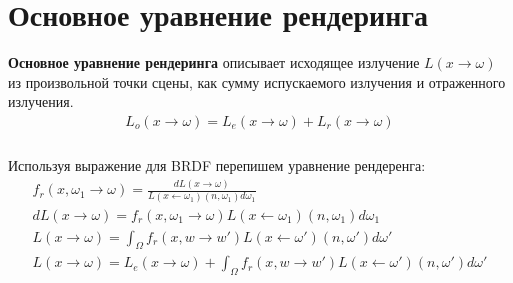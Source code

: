 \documentclass[titlepage]{article}
\begin{document}
\section{Основное уравнение рендеринга}
	\textbf{Основное уравнение рендеринга} описывает исходящее излучение $L(x\rightarrow\omega)$ из произвольной точки сцены, как сумму испускаемого излучения и отраженного излучения. 
\begin{gather}
	L_o(x\rightarrow\omega) = L_e(x\rightarrow\omega) + L_r(x\rightarrow\omega)
\end{gather} 
\subparagraph{} Используя выражение для BRDF перепишем уравнение рендеренга:
\begin{gather}
	f_r(x, \omega_1\rightarrow\omega) = \frac{dL(x\rightarrow\omega)}{L(x\leftarrow\omega_1)(n,\omega_1)d\omega_1} \\
	dL(x\rightarrow\omega) = f_r(x, \omega_1\rightarrow\omega)L(x\leftarrow\omega_1)(n,\omega_1)d\omega_1
	\\
	L(x\rightarrow\omega) = \int_{\Omega}f_r(x,w \rightarrow w')L(x\leftarrow\omega')(n,\omega')d\omega'
	\\L(x\rightarrow\omega) = L_e(x\rightarrow\omega) + \int_{\Omega}f_r(x,w \rightarrow w')L(x\leftarrow\omega')(n,\omega')d\omega'
\end{gather}
\end{document}
